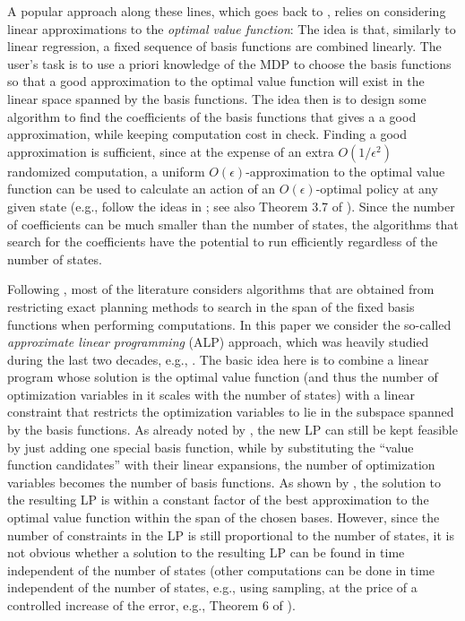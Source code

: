 A popular approach along these lines, which goes back to \citet{SchSei85}, 
relies on considering linear approximations to the \emph{optimal value function}:
The idea is that, similarly to linear regression, a fixed sequence of basis functions are combined
linearly. The user's task is to use a priori knowledge of the MDP 
to choose the basis functions so that 
a good approximation to the optimal value function will exist in the linear space spanned by the basis functions.
The idea then is to design some algorithm to find the coefficients of the basis functions that gives a a good approximation, 
while keeping computation cost in check.
Finding a good approximation is sufficient, since at the expense of an extra $O(1/\epsilon^2)$ randomized computation, 
a uniform $O(\epsilon)$-approximation 
to the optimal value function can be used to calculate an action of an $O(\epsilon)$-optimal policy at any given state
(e.g., follow the ideas in \cite{szepesvari2001,kearns2002sparse}; see also Theorem 3.7 of \citet{Kall17}).
Since the number of coefficients can be much smaller than the number of states, the algorithms that search
for the coefficients have the potential to run efficiently regardless of the number of states.


Following \citet{SchSei85}, most of the literature considers
algorithms that are obtained from restricting exact planning methods to search 
in the span of the fixed basis functions when performing computations.
In this paper we consider the so-called \emph{approximate linear programming} (ALP) approach, which
was heavily studied during the last two decades, e.g.,
\cite{
schuurmans,
gkp,
ALP,
CS,
kveton2004heuristic,
petrik,
SALP,
fs,
npalp,
BhatFaMo12:SALPNP,
abbasi}.
The basic idea here is to combine a linear program whose solution is the optimal value function (and thus the number of optimization variables in it scales with the number of states) with a linear constraint that restricts the optimization variables to lie in the subspace spanned by the basis functions. As already noted by \citet{SchSei85}, the new LP can still be kept feasible by just adding one special basis function, while by substituting the ``value function candidates'' with their linear expansions, the number of optimization variables becomes the number of basis functions. 
As shown by \citet{ALP}, the solution to the resulting LP is within a constant factor of the best approximation to the optimal value function within the span of the chosen bases. However, since the number of constraints in the LP is still proportional to the number of states, it is not obvious whether a solution to the resulting LP can be found in time independent of the number of states (other computations can be done in time independent of the number of states, e.g., using sampling, at the price of a controlled increase of the error, e.g., Theorem 6 of \citep{petrik}).

